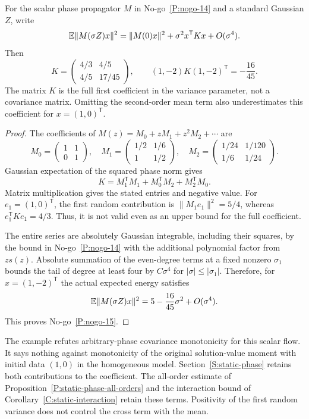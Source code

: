 \setcounter{nogo}{14}
\begin{nogo}
  \label{P:nogo-15}
  For the scalar phase propagator $M$ in No-go~\ref{P:nogo-14} and a
  standard Gaussian $Z$, write
  \[
    \mathbb{E}\|M(\sigma Z)x\|^2=\|M(0)x\|^2+\sigma^2x^{\mathsf T}Kx
    +O(\sigma^4).
  \]
  Then
  \[
    K=\begin{pmatrix}4/3&4/5\\4/5&17/45\end{pmatrix},\qquad
    (1,-2)K(1,-2)^{\mathsf T}=-\frac{16}{45}.
  \]
  The matrix $K$ is the full first coefficient in the variance parameter,
  not a covariance matrix. Omitting the second-order mean term also
  underestimates this coefficient for $x=(1,0)^{\mathsf T}$.
\end{nogo}
\begin{proof}
  The coefficients of $M(z)=M_0+zM_1+z^2M_2+\cdots$ are
  \[
    M_0=\begin{pmatrix}1&1\\0&1\end{pmatrix},\quad
    M_1=\begin{pmatrix}1/2&1/6\\1&1/2\end{pmatrix},\quad
    M_2=\begin{pmatrix}1/24&1/120\\1/6&1/24\end{pmatrix}.
  \]
  Gaussian expectation of the squared phase norm gives
  \[
    K=M_1^{\mathsf T}M_1+M_0^{\mathsf T}M_2+M_2^{\mathsf T}M_0.
  \]
  Matrix multiplication gives the stated entries and negative value.
  For $e_1=(1,0)^{\mathsf T}$, the first random contribution is
  $\|M_1e_1\|^2=5/4$, whereas $e_1^{\mathsf T}Ke_1=4/3$.
  Thus, it is not valid even as an upper bound for the full coefficient.

  The entire series are absolutely Gaussian integrable, including their
  squares, by the bound in No-go~\ref{P:nogo-14} with the additional
  polynomial factor from $zs(z)$. Absolute summation of the even-degree
  terms at a fixed nonzero $\sigma_1$ bounds the tail of degree at least
  four by $C\sigma^4$ for $|\sigma|\le|\sigma_1|$. Therefore, for
  $x=(1,-2)^{\mathsf T}$ the actual expected energy satisfies
  \[
    \mathbb{E}\|M(\sigma Z)x\|^2=5-\frac{16}{45}\sigma^2+O(\sigma^4).
  \]
  This proves No-go~\ref{P:nogo-15}.
\end{proof}

The example refutes arbitrary-phase covariance monotonicity for this
scalar flow. It says nothing against monotonicity of the original
solution-value moment with initial data $(1,0)$ in the homogeneous model.
Section~\ref{S:static-phase} retains both contributions to the coefficient.
The all-order estimate of Proposition~\ref{P:static-phase-all-orders} and
the interaction bound of Corollary~\ref{C:static-interaction} retain these
terms. Positivity of the first random variance does not control the cross
term with the mean.

